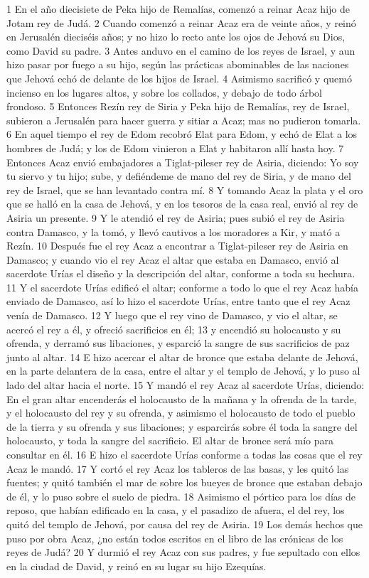 1 En el año diecisiete de Peka hijo de Remalías, comenzó a reinar Acaz hijo de Jotam rey de Judá.
2 Cuando comenzó a reinar Acaz era de veinte años, y reinó en Jerusalén dieciséis años; y no hizo lo recto ante los ojos de Jehová su Dios, como David su padre.
3 Antes anduvo en el camino de los reyes de Israel, y aun hizo pasar por fuego a su hijo, según las prácticas abominables de las naciones que Jehová echó de delante de los hijos de Israel. 
4 Asimismo sacrificó y quemó incienso en los lugares altos, y sobre los collados, y debajo de todo árbol frondoso.
5 Entonces Rezín rey de Siria y Peka hijo de Remalías, rey de Israel, subieron a Jerusalén para hacer guerra y sitiar a Acaz; mas no pudieron tomarla. 
6 En aquel tiempo el rey de Edom recobró Elat para Edom, y echó de Elat a los hombres de Judá; y los de Edom vinieron a Elat y habitaron allí hasta hoy.
7 Entonces Acaz envió embajadores a Tiglat-pileser rey de Asiria, diciendo: Yo soy tu siervo y tu hijo; sube, y defiéndeme de mano del rey de Siria, y de mano del rey de Israel, que se han levantado contra mí.
8 Y tomando Acaz la plata y el oro que se halló en la casa de Jehová, y en los tesoros de la casa real, envió al rey de Asiria un presente.
9 Y le atendió el rey de Asiria; pues subió el rey de Asiria contra Damasco, y la tomó, y llevó cautivos a los moradores a Kir, y mató a Rezín. 
10 Después fue el rey Acaz a encontrar a Tiglat-pileser rey de Asiria en Damasco; y cuando vio el rey Acaz el altar que estaba en Damasco, envió al sacerdote Urías el diseño y la descripción del altar, conforme a toda su hechura.
11 Y el sacerdote Urías edificó el altar; conforme a todo lo que el rey Acaz había enviado de Damasco, así lo hizo el sacerdote Urías, entre tanto que el rey Acaz venía de Damasco.
12 Y luego que el rey vino de Damasco, y vio el altar, se acercó el rey a él, y ofreció sacrificios en él;
13 y encendió su holocausto y su ofrenda, y derramó sus libaciones, y esparció la sangre de sus sacrificios de paz junto al altar.
14 E hizo acercar el altar de bronce que estaba delante de Jehová, en la parte delantera de la casa, entre el altar y el templo de Jehová, y lo puso al lado del altar hacia el norte.
15 Y mandó el rey Acaz al sacerdote Urías, diciendo: En el gran altar encenderás el holocausto de la mañana y la ofrenda de la tarde, y el holocausto del rey y su ofrenda, y asimismo el holocausto de todo el pueblo de la tierra y su ofrenda y sus libaciones; y esparcirás sobre él toda la sangre del holocausto, y toda la sangre del sacrificio. El altar de bronce será mío para consultar en él.
16 E hizo el sacerdote Urías conforme a todas las cosas que el rey Acaz le mandó.
17 Y cortó el rey Acaz los tableros de las basas, y les quitó las fuentes; y quitó también el mar de sobre los bueyes de bronce que estaban debajo de él, y lo puso sobre el suelo de piedra.
18 Asimismo el pórtico para los días de reposo, que habían edificado en la casa, y el pasadizo de afuera, el del rey, los quitó del templo de Jehová, por causa del rey de Asiria.
19 Los demás hechos que puso por obra Acaz, ¿no están todos escritos en el libro de las crónicas de los reyes de Judá?
20 Y durmió el rey Acaz con sus padres, y fue sepultado con ellos en la ciudad de David, y reinó en su lugar su hijo Ezequías.

